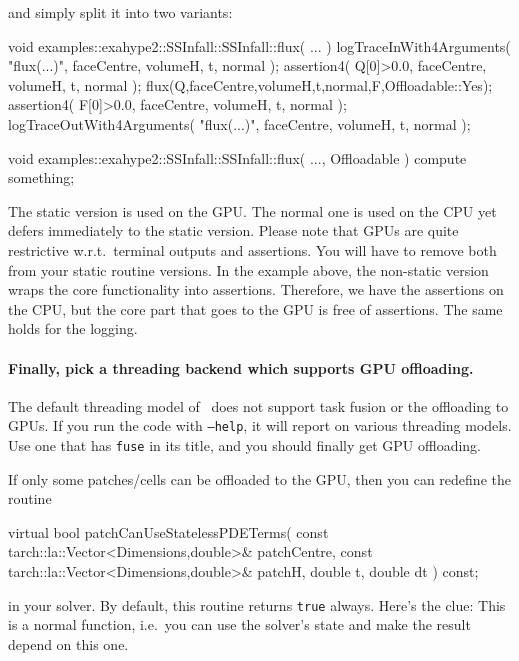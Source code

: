 \noindent
and simply split it into two variants:
\begin{code}
void examples::exahype2::SSInfall::SSInfall::flux(
 ...
)  {
  logTraceInWith4Arguments( "flux(...)", faceCentre, volumeH, t, normal );
  assertion4( Q[0]>0.0, faceCentre, volumeH, t, normal );
  flux(Q,faceCentre,volumeH,t,normal,F,Offloadable::Yes);
  assertion4( F[0]>0.0, faceCentre, volumeH, t, normal );
  logTraceOutWith4Arguments( "flux(...)", faceCentre, volumeH, t, normal );
}


void examples::exahype2::SSInfall::SSInfall::flux(
  ...,
  Offloadable
)  {
  compute something;
}
\end{code}


\noindent
The static version is used on the GPU. 
The normal one is used on the CPU yet defers immediately to the static version.
Please note that GPUs are quite restrictive w.r.t.~terminal outputs and
assertions.
You will have to remove both from your static routine versions.
In the example above, the non-static version wraps the core functionality into
assertions. 
Therefore, we have the assertions on the CPU, but the core part that goes to the
GPU is free of assertions.
The same holds for the logging.


\paragraph{Finally, pick a threading backend which supports GPU offloading.}
%
%
%
The default threading model of \Peano\ does not support task fusion or the
offloading to GPUs. 
If you run the code with \texttt{--help}, it will report on various threading
models.
Use one that has \texttt{fuse} in its title, and you should finally get GPU
offloading.




\begin{remark}
 If only some patches/cells can be offloaded to the GPU, then you can redefine
 the routine
 \begin{code}
virtual bool patchCanUseStatelessPDETerms(
  const tarch::la::Vector<Dimensions,double>&  patchCentre,
  const tarch::la::Vector<Dimensions,double>&  patchH,
  double                                       t,
  double                                       dt
) const;
 \end{code} 
 
 \noindent
 in your
 solver. By default, this routine returns \texttt{true} always. Here's the clue: 
 This is a normal function, i.e.~you can use the solver's state and make the
 result depend on this one.
\end{remark}


